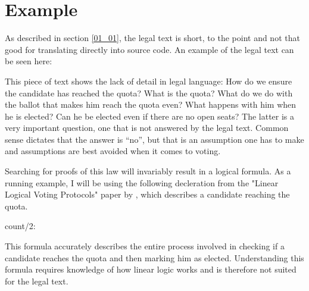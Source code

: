 \section{Example}
\label{02_01}

As described in section \ref{01_01}, the legal text is short, to the point and not that good for translating directly into source code. An example of the legal text can be seen here:


This piece of text shows the lack of detail in legal language: How do we ensure the candidate has reached the quota? What is the quota? What do we do with the ballot that makes him reach the quota even? What happens with him when he is elected? Can he be elected even if there are no open seats? The latter is a very important question, one that is not answered by the legal text. Common sense dictates that the answer is “no”, but that is an assumption one has to make and assumptions are best avoided when it comes to voting.  

Searching for proofs of this law will invariably result in a logical formula. As a running example, I will be using the following decleration from the "Linear Logical Voting Protocols"\cite{Deyoung11} paper by \citeauthor{Deyoung11}, which describes a candidate reaching the quota.

\begin{textoform}
	count/2: \\
\end{textoform}

This formula accurately describes the entire process involved in checking if a candidate reaches the quota and then marking him as elected. Understanding this formula requires knowledge of how linear logic works and is therefore not suited for the legal text.

